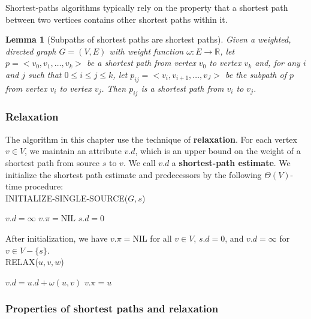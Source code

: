 \documentclass[12pt]{article}
\newtheorem{lemma}[theorem]{Lemma}
\begin{document}
Shortest-paths algorithms typically rely on the property that a shortest path between two vertices contains other shortest paths within it.

\begin{lemma} [Subpaths of shortest paths are shortest paths]
  Given a weighted, directed graph $G = (V,E)$ with weight function $\omega : E \rightarrow \mathbb{R}$, let $p = <v_0, v_1, \dots, v_k>$ be a shortest path from vertex $v_0$ to vertex $v_k$ and, for any $i$ and $j$ such that $0 \le i \le j \le k$, let $p_{ij} = <v_i, v_{i+1}, \dots, v_J>$ be the subpath of $p$ from vertex $v_i$ to vertex $v_j$. Then $p_{ij}$ is a shortest path from $v_i$ to $v_j$.
\end{lemma}

\subsubsection*{Relaxation}

The algorithm in this chapter use the technique of \textbf{relaxation}. For each vertex $v \in V$, we maintain an attribute $v.d$, which is an upper bound on the weight of a shortest path from source $s$ to $v$. We call $v.d$ a \textbf{shortest-path estimate}. We initialize the shortest path estimate and predecessors by the following $\Theta(V)$-time procedure: \\

INITIALIZE-SINGLE-SOURCE($G,s$)
\begin{algorithmic} [1]
	\State $v.d = \infty$
        \State $v.\pi = \text{NIL}$
\EndFor
\State $s.d = 0$
\end{algorithmic}

After initialization, we have $v.\pi = \text{NIL}$ for all $v \in V$, $s.d = 0$, and $v.d = \infty$ for $v \in V - \{ s \}$. \\

RELAX($u,v,w$)
\begin{algorithmic} [1]
	\State $v.d = u.d + \omega(u,v)$
	\State $v.\pi = u$
\EndIf
\end{algorithmic}

\subsubsection*{Properties of shortest paths and relaxation}
\end{document}
